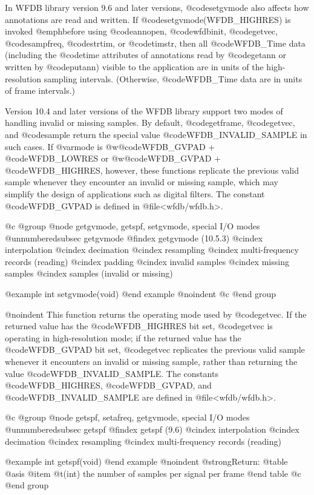 {{{{{{{{In WFDB library version 9.6 and later versions, @code{setgvmode} also affects
how annotations are read and written.  If @code{setgvmode(WFDB_HIGHRES)} is
invoked @emph{before} using @code{annopen}, @code{wfdbinit}, @code{getvec},
@code{sampfreq}, @code{strtim}, or @code{timstr}, then all @code{WFDB_Time}
data (including the @code{time} attributes of annotations read by @code{getann}
or written by @code{putann}) visible to the application are in units of the
high-resolution sampling intervals.  (Otherwise, @code{WFDB_Time} data are in
units of frame intervals.)

Version 10.4 and later versions of the WFDB library support two modes
of handling invalid or missing samples.  By default, @code{getframe},
@code{getvec}, and @code{sample} return the special value
@code{WFDB_INVALID_SAMPLE} in such cases.  If @var{mode} is
@w{@code{WFDB_GVPAD} + @code{WFDB_LOWRES}} or 
@w{@code{WFDB_GVPAD} + @code{WFDB_HIGHRES}},
however, these functions replicate the previous
valid sample whenever they encounter an invalid or missing sample,
which may simplify the design of applications such as digital filters.
The constant @code{WFDB_GVPAD} is defined in @file{<wfdb/wfdb.h>}.

@c @group
@node     getgvmode, getspf, setgvmode, special I/O modes
@unnumberedsubsec getgvmode
@findex getgvmode (10.5.3)
@cindex interpolation
@cindex decimation
@cindex resampling
@cindex multi-frequency records (reading)
@cindex padding
@cindex invalid samples
@cindex missing samples
@cindex samples (invalid or missing)

@example
int setgvmode(void)
@end example
@noindent
@c @end group

@noindent
This function returns the operating mode used by @code{getvec}.  If the
returned value has the @code{WFDB_HIGHRES} bit set, @code{getvec} is operating
in high-resolution mode;  if the returned value has the @code{WFDB_GVPAD} bit
set, @code{getvec} replicates the previous valid sample whenever it encounters
an invalid or missing sample, rather than returning the value
@code{WFDB_INVALID_SAMPLE}.  The constants @code{WFDB_HIGHRES},
@code{WFDB_GVPAD}, and @code{WFDB_INVALID_SAMPLE} are defined in
@file{<wfdb/wfdb.h>}.

@c @group
@node     getspf, setafreq, getgvmode, special I/O modes
@unnumberedsubsec getspf
@findex getspf (9.6)
@cindex interpolation
@cindex decimation
@cindex resampling
@cindex multi-frequency records (reading)

@example
int getspf(void)
@end example
@noindent
@strong{Return:}
@table @asis
@item @t{(int)}
the number of samples per signal per frame
@end table
@c @end group

}}}}}}}}
